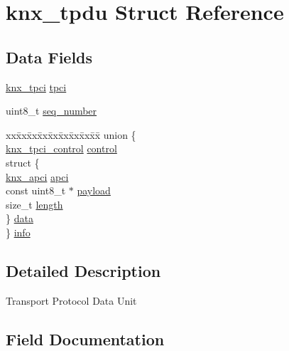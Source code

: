 \hypertarget{structknx__tpdu}{}\section{knx\+\_\+tpdu Struct Reference}
\label{structknx__tpdu}
\subsection*{Data Fields}
\begin{DoxyCompactItemize}
\item 
\hyperlink{tpdu_8h_a733c5f7d9c5d89eb999ac1dee021682a}{knx\+\_\+tpci} \hyperlink{structknx__tpdu_ac7420f748442fdfd7bfeff18b5303614}{tpci}
\item 
uint8\+\_\+t \hyperlink{structknx__tpdu_a6550220aae73dde64314cab49b83f27c}{seq\+\_\+number}
\item 
\begin{tabbing}
xx\=xx\=xx\=xx\=xx\=xx\=xx\=xx\=xx\=\kill
union \{\\
\>\hyperlink{tpdu_8h_ae7b800e7475f6cc101ca5a31c1a50f48}{knx\_tpci\_control} \hyperlink{structknx__tpdu_ae90e15aae00f9581fb487af4dfa2f8f0}{control}\\
\>struct \{\\
\>\>\hyperlink{tpdu_8h_a4650bb624572da4ef75f9a631a303864}{knx\_apci} \hyperlink{structknx__tpdu_a6e337499867cdf5a71636ca286677916}{apci}\\
\>\>const uint8\_t $\ast$ \hyperlink{structknx__tpdu_a13ab4255465e6196814ec91bb39eb193}{payload}\\
\>\>size\_t \hyperlink{structknx__tpdu_a3d47bdbccf5dbb1865ed2b4b88588d48}{length}\\
\>\} \hyperlink{structknx__tpdu_aa9ed5329afde048f53431af7a4582726}{data}\\
\} \hyperlink{structknx__tpdu_a2dcc1d62735212949841a228cc5c45e8}{info}\\

\end{tabbing}\end{DoxyCompactItemize}


\subsection{Detailed Description}
Transport Protocol Data Unit 

\subsection{Field Documentation}
